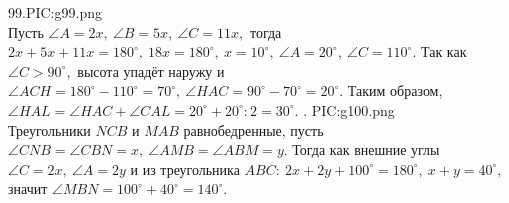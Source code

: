 99.{{PIC:g99.png}}\\
Пусть $\angle A=2x,\ \angle B=5x,\ \angle C=11x,$ тогда $2x+5x+11x=180^\circ,\ 18x=180^\circ,\ x=10^\circ,\ \angle A=20^\circ,\ \angle C=110^\circ.$ Так как $\angle C>90^\circ,$ высота упадёт наружу и  $\angle ACH=180^\circ-110^\circ=70^\circ,\ \angle HAC=90^\circ-70^\circ=20^\circ.$ Таким образом, $\angle HAL=\angle HAC+\angle CAL=20^\circ+20^\circ:2=30^\circ.$\newpage
{}. {{PIC:g100.png}}\\
Треугольники $NCB$ и $MAB$ равнобедренные, пусть $\angle CNB=\angle CBN=x,\ \angle AMB=\angle ABM=y.$ Тогда как внешние углы $\angle C=2x,\ \angle A=2y$ и из треугольника $ABC:\ 2x+2y+100^\circ=180^\circ,\ x+y=40^\circ,$ значит $\angle MBN=100^\circ+40^\circ=140^\circ.$\\
